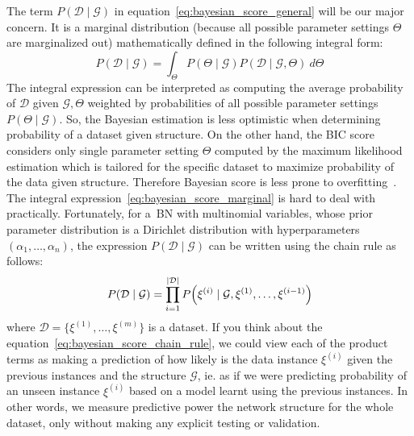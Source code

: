 \documentclass[english,cover]{fitthesis} %
\begin{document}
The term $P(\mathcal{D} \mid \mathcal{G})$ in equation~\eqref{eq:bayesian_score_general} will be our major concern. It is a marginal distribution (because all possible parameter settings $\Theta$ are marginalized out) mathematically defined in the following integral form:
\begin{equation}\label{eq:bayesian_score_marginal}
    P(\mathcal{D} \mid \mathcal{G})
    =
    \int_{\Theta} P(\Theta \mid \mathcal{G}) P(\mathcal{D} \mid \mathcal{G}, \Theta) \ d \Theta
\end{equation}
The integral expression can be interpreted as computing the average probability of $\mathcal{D}$ given $\mathcal{G},\Theta$ weighted by probabilities of all possible parameter settings $P(\Theta \mid \mathcal{G})$. So, the Bayesian estimation is less optimistic when determining probability of a dataset given structure. On the other hand, the BIC score considers only single parameter setting $\Theta$ computed by the maximum likelihood estimation which is tailored for the specific dataset to maximize probability of the data given structure. Therefore Bayesian score is less prone to overfitting~\cite[p.~795]{pgm}.
The integral expression~\eqref{eq:bayesian_score_marginal} is hard to deal with practically. Fortunately, for a~BN with multinomial variables, whose prior parameter distribution is a Dirichlet distribution with hyperparameters $(\alpha_1, \dots, \alpha_n)$, the expression $P(\mathcal{D} \mid \mathcal{G})$ can be written using the chain rule as follows:
\begin{equation}\label{eq:bayesian_score_chain_rule}
    P(\mathcal{D} \mid \mathcal{G})
    =
     \prod_{i = 1}^{| \mathcal{D} |}
             P \Bigl( \xi^{(i)} \mid \mathcal{G}, \xi^{(1)}, \dots, \xi^{(i - 1)} \Bigr)
\end{equation}
where $\mathcal{D} = \lbrace \xi^{(1)}, \dots, \xi^{(m)} \rbrace$ is a dataset. If you think about the equation~\eqref{eq:bayesian_score_chain_rule}, we could view each of the product terms as making a prediction of how likely is the data instance $\xi^{(i)}$ given the previous instances and the structure $\mathcal{G}$, ie. as if we were predicting probability of an unseen instance $\xi^{(i)}$ based on a model learnt using the previous instances. In other words, we measure predictive power the network structure for the whole dataset, only without making any explicit testing or validation.
\end{document}
